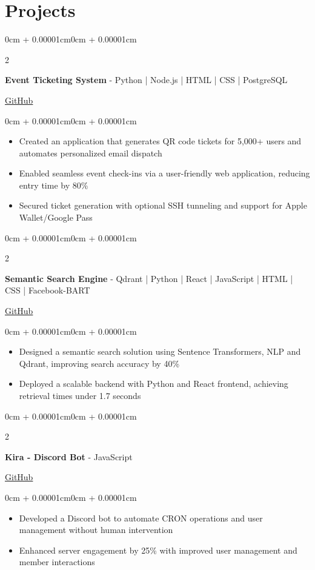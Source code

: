 \documentclass[10pt,letterpaper]{article}
\newenvironment{highlights}{
    \begin{itemize}[
        topsep=0.05cm,
        parsep=0.05cm,
        partopsep=0pt,
        itemsep=0pt,
        leftmargin=8pt
    ]
}{
    \end{itemize}
}
\newenvironment{onecolentry}{
    \begin{adjustwidth}{0cm + 0.00001cm}{0cm + 0.00001cm}
}{
    \end{adjustwidth}
}
\newenvironment{twocolentry}[2][]{
    \onecolentry
    \def\secondColumn{#2}
    \setcolumnwidth{\fill, 4.0cm}
    \begin{paracol}{2}
}{
    \switchcolumn \raggedleft \secondColumn
    \end{paracol}
    \endonecolentry
}
\begin{document}
\section{Projects}
    \begin{twocolentry}{
        \href{https://github.com/aksisonline/PythonMailer-TicketGenerator}{GitHub}
    }
        \textbf{Event Ticketing System} - Python | Node.js | HTML | CSS | PostgreSQL
    \end{twocolentry}
    \begin{onecolentry}
        \begin{highlights}
            \item Created an application that generates QR code tickets for 5,000+ users and automates personalized email dispatch
            \item Enabled seamless event check-ins via a user-friendly web application, reducing entry time by 80\%
            \item Secured ticket generation with optional SSH tunneling and support for Apple Wallet/Google Pass
        \end{highlights}
    \end{onecolentry}

    \begin{twocolentry}{
        \href{https://github.com/aksisonline/Semantic-Search-Engine}{GitHub}
    }
        \textbf{Semantic Search Engine} -  Qdrant | Python | React | JavaScript | HTML | CSS | Facebook-BART
    \end{twocolentry}
    \begin{onecolentry}
        \begin{highlights}
            \item Designed a semantic search solution using Sentence Transformers, NLP and Qdrant, improving search accuracy by 40\%
            \item Deployed a scalable backend with Python and React frontend, achieving retrieval times under 1.7 seconds
        \end{highlights}
    \end{onecolentry}

    \begin{twocolentry}{
        \href{https://github.com/aksisonline/Kira-on-JS}{GitHub}
    }
        \textbf{Kira - Discord Bot} - JavaScript
    \end{twocolentry}
    \begin{onecolentry}
        \begin{highlights}
            \item Developed a Discord bot to automate CRON operations and user management without human intervention
            \item Enhanced server engagement by 25\% with improved user management and member interactions
        \end{highlights}
    \end{onecolentry}
\end{document}
